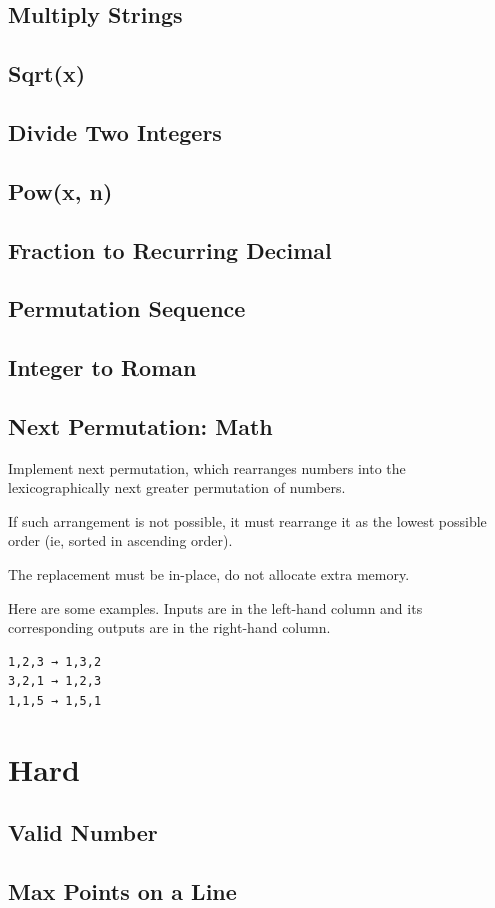 \documentclass[11pt]{book}
\begin{document}
\subsection{Multiply Strings}
\label{sec-21-2-1}
\subsection{Sqrt(x)}
\label{sec-21-2-2}
\subsection{Divide Two Integers}
\label{sec-21-2-3}
\subsection{Pow(x, n)}
\label{sec-21-2-4}
\subsection{Fraction to Recurring Decimal}
\label{sec-21-2-5}
\subsection{Permutation Sequence}
\label{sec-21-2-6}
\subsection{Integer to Roman}
\label{sec-21-2-7}
\subsection{Next Permutation: Math}
\label{sec-21-2-8}
Implement next permutation, which rearranges numbers into the lexicographically next greater permutation of numbers.

If such arrangement is not possible, it must rearrange it as the lowest possible order (ie, sorted in ascending order).

The replacement must be in-place, do not allocate extra memory.

Here are some examples. Inputs are in the left-hand column and its
corresponding outputs are in the right-hand column.
\lstset{language=java,label= ,caption= ,numbers=none}
\begin{lstlisting}
1,2,3 → 1,3,2
3,2,1 → 1,2,3
1,1,5 → 1,5,1
\end{lstlisting}

\section{Hard}
\label{sec-21-3}
\subsection{Valid Number}
\label{sec-21-3-1}
\subsection{Max Points on a Line}
\label{sec-21-3-2}
\end{document}
